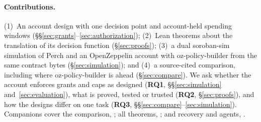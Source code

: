 \paragraph{Contributions.} (1)~An account design with one decision point and
account-held spending windows (\S\S\ref{sec:grants}--\ref{sec:authorization});
(2)~Lean theorems about the translation of its decision function
(\S\ref{sec:proofs}); (3)~a dual soroban-sim simulation of Perch and an
OpenZeppelin account with oz-policy-builder from the same contract bytes
(\S\ref{sec:simulation}); and (4)~a source-cited comparison, including where
oz-policy-builder is ahead (\S\ref{sec:compare}). We ask whether the account
enforces grants and caps as designed (\textbf{RQ1}, \S\S\ref{sec:simulation}
and~\ref{sec:evaluation}), what is proved, tested or trusted (\textbf{RQ2},
\S\ref{sec:proofs}), and how the designs differ on one task (\textbf{RQ3},
\S\S\ref{sec:compare}--\ref{sec:simulation}).
Companions cover the comparison, ; all theorems,
; and recovery and agents, .
